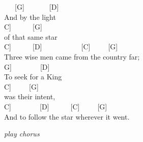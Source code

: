 \documentclass[
  letterpaper,
  a5paper]{memoir}
\begin{document}
~~~{[}G{]}~~~~~~~{[}D{]}\\
And by the light\\
\hspace*{0.333em}\hspace*{0.333em}\hspace*{0.333em}{[}C{]}~~~~~~{[}G{]}\\
of that same star\\
\hspace*{0.333em}\hspace*{0.333em}\hspace*{0.333em}\hspace*{0.333em}\hspace*{0.333em}{[}C{]}~~~~~~{[}D{]}~~~~~~~~~~~{[}C{]}~~~~~{[}G{]}\\
Three wise men came from the country far;\\
\hspace*{0.333em}\hspace*{0.333em}{[}G{]}~~~~~~~~{[}D{]}\\
To seek for a King\\
\hspace*{0.333em}\hspace*{0.333em}\hspace*{0.333em}{[}C{]}~~~~~{[}G{]}\\
was their intent,\\
\hspace*{0.333em}\hspace*{0.333em}\hspace*{0.333em}\hspace*{0.333em}\hspace*{0.333em}\hspace*{0.333em}{[}C{]}~~~~~~~~{[}D{]}~~~~~~{[}C{]}~~~~~{[}G{]}\\
And to follow the star wherever it went.

\emph{play chorus}
\end{document}

